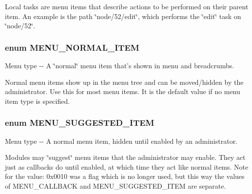 Local tasks are menu items that describe actions to be performed on their parent item. An example is the path \char`\"{}node/52/edit\char`\"{}, which performs the \char`\"{}edit\char`\"{} task on \char`\"{}node/52\char`\"{}. \hypertarget{group__menu__item__types_gac42144282c42a943b05511b38c451e4c}{
\subsubsection[{MENU\_\-NORMAL\_\-ITEM}]{\setlength{\rightskip}{0pt plus 5cm}enum {\bf MENU\_\-NORMAL\_\-ITEM}}}
\label{group__menu__item__types_gac42144282c42a943b05511b38c451e4c}
Menu type -\/-\/ A \char`\"{}normal\char`\"{} menu item that's shown in menu and breadcrumbs.

Normal menu items show up in the menu tree and can be moved/hidden by the administrator. Use this for most menu items. It is the default value if no menu item type is specified. \hypertarget{group__menu__item__types_ga0860a2534ce61dc1334dc7ede68e20b3}{
\subsubsection[{MENU\_\-SUGGESTED\_\-ITEM}]{\setlength{\rightskip}{0pt plus 5cm}enum {\bf MENU\_\-SUGGESTED\_\-ITEM}}}
\label{group__menu__item__types_ga0860a2534ce61dc1334dc7ede68e20b3}
Menu type -\/-\/ A normal menu item, hidden until enabled by an administrator.

Modules may \char`\"{}suggest\char`\"{} menu items that the administrator may enable. They act just as callbacks do until enabled, at which time they act like normal items. Note for the value: 0x0010 was a flag which is no longer used, but this way the values of MENU\_\-CALLBACK and MENU\_\-SUGGESTED\_\-ITEM are separate. 